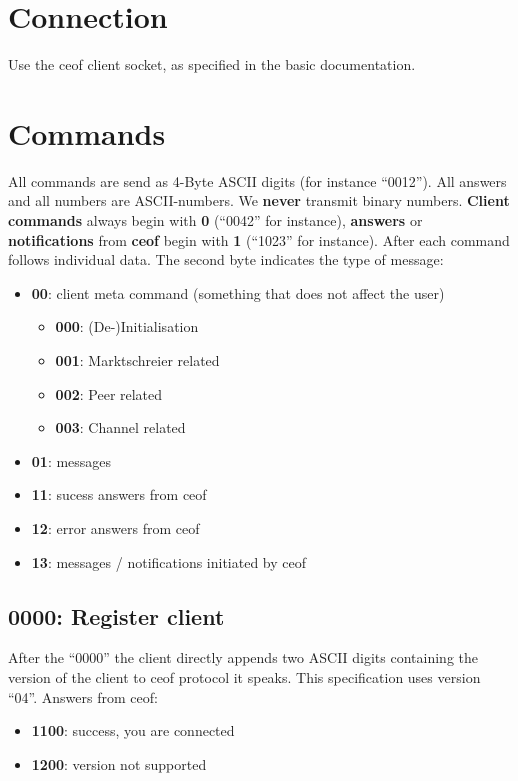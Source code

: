 \documentclass[12pt,a4paper]{article}
\begin{document}
\section{Connection}
Use the ceof client socket, as specified in the basic documentation.
\section{Commands}
All commands are send as 4-Byte ASCII digits (for instance "`0012"').
All answers and all numbers are ASCII-numbers. We
\textbf{never} transmit binary numbers.
\textbf{Client commands} always begin with \textbf{0} ("`0042"' for instance),
\textbf{answers} or \textbf{notifications} from
\textbf{ceof} begin with \textbf{1} ("`1023"' for instance).
After each command follows individual data. The second byte indicates the type of message:
\begin{itemize}
\item \textbf{00}: client meta command (something that does not affect the user)
\begin{itemize}
\item \textbf{000}: (De-)Initialisation
\item \textbf{001}: Marktschreier related
\item \textbf{002}: Peer related
\item \textbf{003}: Channel related
\end{itemize}
\item \textbf{01}: messages
\item \textbf{11}: sucess answers from ceof
\item \textbf{12}: error answers from ceof
\item \textbf{13}: messages / notifications initiated by ceof
\end{itemize}

\subsection{0000: Register client}
After the "`0000"' the client directly appends two ASCII digits containing the
version of the client to ceof protocol it speaks. This specification uses version
"`04"'.
Answers from ceof:
\begin{itemize}
\item \textbf{1100}: success, you are connected
\item \textbf{1200}: version not supported
\end{itemize}
\end{document}
